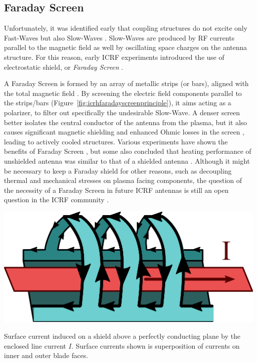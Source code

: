 
\subsection{Faraday Screen}
Unfortunately, it was identified early that coupling structures do not excite only Fast-Waves but also Slow-Waves . Slow-Waves are produced by RF currents parallel to the magnetic field as well by oscillating space charges on the antenna structure. For this reason, early ICRF experiments introduced the use of electrostatic shield, or \textit{Faraday Screen} . 

A Faraday Screen is formed by an array of metallic strips (or bars), aligned with the total magnetic field . By screening the electric field components parallel to the strips/bars (Figure~\ref{fig:icrhfaradayscreenprinciple}), it aims acting as a polarizer, to filter out specifically the undesirable Slow-Wave. A denser screen better isolates the central conductor of the antenna from the plasma, but it also causes significant magnetic shielding and enhanced Ohmic losses in the screen , leading to actively cooled structures. Various experiments have shown the benefits of Faraday Screen , but some also concluded that heating performance of unshielded antenna was similar to that of a shielded antenna .  Although it might be necessary to keep a Faraday shield for other reasons, such as decoupling thermal and mechanical stresses on plasma facing components, the question of the necessity of a Faraday Screen in future ICRF antennas is still an open question in the ICRF community . 

\begin{marginfigure}
	\includegraphics[width=1.0\linewidth]{figures/chap3/WEST_ICRH/ICRH_Faraday_Screen_Principle}
	\caption{Surface current induced on a shield above a perfectly conducting plane by the enclosed line current $I$. Surface currents shown is superposition of currents on inner and outer blade faces.}
	\label{fig:icrhfaradayscreenprinciple}
\end{marginfigure}

